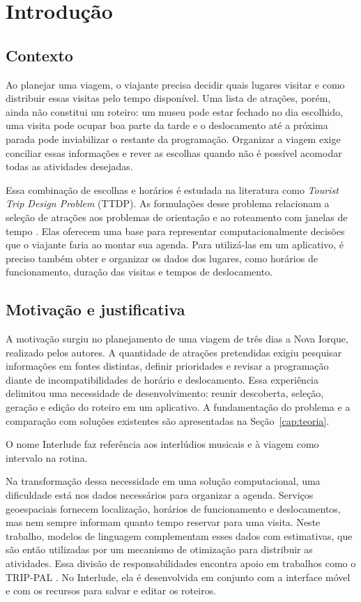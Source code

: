 \chapter[Introdução]{Introdução}
\label{cap:introducao}

\section{Contexto}

Ao planejar uma viagem, o viajante precisa decidir quais lugares visitar e como distribuir essas visitas pelo tempo disponível. Uma lista de atrações, porém, ainda não constitui um roteiro: um museu pode estar fechado no dia escolhido, uma visita pode ocupar boa parte da tarde e o deslocamento até a próxima parada pode inviabilizar o restante da programação. Organizar a viagem exige conciliar essas informações e rever as escolhas quando não é possível acomodar todas as atividades desejadas.

Essa combinação de escolhas e horários é estudada na literatura como \textit{Tourist Trip Design Problem} (TTDP). As formulações desse problema relacionam a seleção de atrações aos problemas de orientação e ao roteamento com janelas de tempo \cite{gavalas2014survey,vansteenwegen2007mobile}. Elas oferecem uma base para representar computacionalmente decisões que o viajante faria ao montar sua agenda. Para utilizá-las em um aplicativo, é preciso também obter e organizar os dados dos lugares, como horários de funcionamento, duração das visitas e tempos de deslocamento.

\section{Motivação e justificativa}

A motivação surgiu no planejamento de uma viagem de três dias a Nova Iorque, realizado pelos autores. A quantidade de atrações pretendidas exigiu pesquisar informações em fontes distintas, definir prioridades e revisar a programação diante de incompatibilidades de horário e deslocamento. Essa experiência delimitou uma necessidade de desenvolvimento: reunir descoberta, seleção, geração e edição do roteiro em um aplicativo. A fundamentação do problema e a comparação com soluções existentes são apresentadas na Seção~\ref{cap:teoria}.

O nome Interlude faz referência aos interlúdios musicais e à viagem como intervalo na rotina.

Na transformação dessa necessidade em uma solução computacional, uma dificuldade está nos dados necessários para organizar a agenda. Serviços geoespaciais fornecem localização, horários de funcionamento e deslocamentos, mas nem sempre informam quanto tempo reservar para uma visita. Neste trabalho, modelos de linguagem complementam esses dados com estimativas, que são então utilizadas por um mecanismo de otimização para distribuir as atividades. Essa divisão de responsabilidades encontra apoio em trabalhos como o TRIP-PAL \cite{delarosa2024trippal}. No Interlude, ela é desenvolvida em conjunto com a interface móvel e com os recursos para salvar e editar os roteiros.

